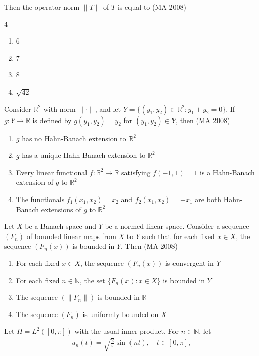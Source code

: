 Then the operator norm $\|T\|$ of $T$ is equal to
\hfill (MA 2008)
\begin{multicols}{4}
\begin{enumerate}
    \item 6
    \item 7
    \item 8
    \item $\sqrt{42}$
\end{enumerate}
\end{multicols}

\item
Consider $\mathbb{R}^2$ with norm $\|\cdot\|$, and let $Y = \{(y_1,y_2) \in \mathbb{R}^2 : y_1 + y_2 = 0\}$. If $g : Y \to \mathbb{R}$ is defined by $g(y_1,y_2) = y_2$ for $(y_1,y_2) \in Y$, then
\hfill (MA 2008)

\begin{enumerate}
    \item $g$ has no Hahn-Banach extension to $\mathbb{R}^2$
    \item $g$ has a unique Hahn-Banach extension to $\mathbb{R}^2$
    \item Every linear functional $f : \mathbb{R}^2 \to \mathbb{R}$ satisfying $f(-1,1) = 1$ is a Hahn-Banach extension of $g$ to $\mathbb{R}^2$
    \item The functionals $f_1(x_1,x_2) = x_2$ and $f_2(x_1,x_2) = -x_1$ are both Hahn-Banach extensions of $g$ to $\mathbb{R}^2$
\end{enumerate}


\item
Let $X$ be a Banach space and $Y$ be a normed linear space. Consider a sequence $(F_n)$ of bounded linear maps from $X$ to $Y$ such that for each fixed $x \in X$, the sequence $(F_n(x))$ is bounded in $Y$. Then
\hfill (MA 2008)

\begin{enumerate}
    \item For each fixed $x \in X$, the sequence $(F_n(x))$ is convergent in $Y$
    \item For each fixed $n \in \mathbb{N}$, the set $\{F_n(x) : x \in X \}$ is bounded in $Y$
    \item The sequence $(\|F_n\|)$ is bounded in $\mathbb{R}$
    \item The sequence $(F_n)$ is uniformly bounded on $X$
\end{enumerate}

\item
Let $H = L^2([0, \pi])$ with the usual inner product. For $n \in \mathbb{N}$, let
\begin{align}
    u_n(t) = \sqrt{\frac{2}{\pi}} \sin(n t), \quad t \in [0, \pi],
\end{align}

